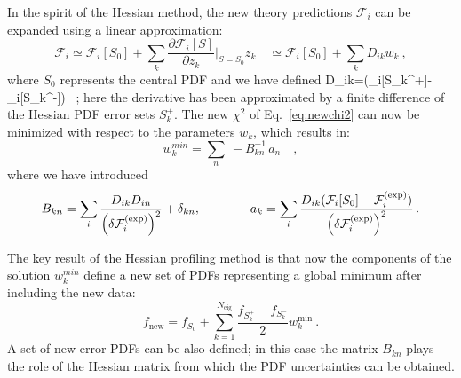 In the spirit of the Hessian method, the new theory predictions $\mathcal{F}_i$ can be expanded
using a linear approximation:
\begin{equation}
\mathcal{F}_i \simeq \mathcal{F}_i[S_0] + \sum_k \frac{\partial\mathcal{F}_i[S]}{\partial z_k}\bigg|_{S=S_0} z_k \quad
              \simeq \mathcal{F}_i[S_0] + \sum_k D_{ik} w_k \ ,
\end{equation}
where $S_0$ represents the central PDF and we have defined
\be
D_{ik}=(_i[S_k^+]-_i[S_k^-]) \, ;
\ee
here the  derivative has been approximated by a finite difference of the 
Hessian PDF error sets $S_k^{\pm}$.
%
The new $\chi^2$ of Eq.~\eqref{eq:newchi2} can now be minimized with respect to the parameters $w_k$,
which results in:
\begin{equation}
%
w_k^{min}  = \sum_n \ -B_{kn}^{-1} \, a_n \quad ,
\end{equation}
where we have introduced
\begin{equation}
B_{kn} = \sum_i {{D_{ik}D_{in}}\over {\left(\delta\mathcal{F}_i^{\rm(exp)}\right)^2}} + \delta_{kn},
\qquad
\qquad
a_k = \sum_i {{D_{ik}(\mathcal{F}_i[S_0] - \mathcal{F}_i^{\rm(exp)})}\over {\left(\delta\mathcal{F}_i^{\rm(exp)}\right)^2}} \, . 
\end{equation}

The key result of the Hessian profiling method
is that now the components of the solution 
$w_k^{min}$
define a new set
of PDFs representing a global minimum after including the new data:
\begin{equation}
f_{\text{new}} = f_{S_0} + \sum_{k=1}^{N_{\text{eig}}} \frac{f_{S_k^+}-f_{S_k^-}}{2} w_k^{\text{min}} \ .
\end{equation}
A set of new error PDFs can be also defined; in this case the matrix $B_{kn}$ plays the role of
the Hessian matrix from which the PDF uncertainties
can be obtained. 

